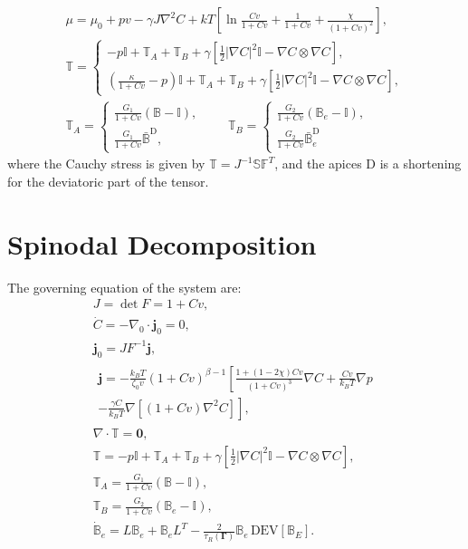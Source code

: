 \documentclass[12pt]{extarticle}
\newcommand{\F}{\ensuremath{\mathbb{F}}}
\newcommand{\B}{\ensuremath{\mathbb{B}}}
\newcommand{\D}{\ensuremath{\text{D}}}
\begin{document}
\begin{gather}
\mu = \mu_0 + p v - \gamma J\nabla^2 C + kT\left[\ln \frac{Cv}{1+Cv} + \frac{1}{1+Cv} +\frac{\chi}{(1+Cv)^2}\right],\\
\mathbb{T} = \begin{cases}
-p \mathbb{I} +\mathbb{T}_A +\mathbb{T}_B + \gamma\left[\frac{1}{2} |\nabla C|^2\mathbb{I}-\nabla C \otimes \nabla C\right],\\[2mm]
\left(\frac{\kappa}{1+Cv}-p\right) \mathbb{I} +\mathbb{T}_A +\mathbb{T}_B + \gamma\left[\frac{1}{2} |\nabla C|^2\mathbb{I}-\nabla C \otimes \nabla C\right],
\end{cases}\\
\mathbb{T}_A=\begin{cases}
\frac{G_1}{1+Cv}(\mathbb{B}-\mathbb{I}),\\[2mm]
\frac{G_1}{1+Cv} \bar{\B}^\D,
\end{cases}
\qquad
\mathbb{T}_B=\begin{cases}
\frac{G_2}{1+Cv}(\mathbb{B}_e-\mathbb{I}),\\[2mm]
\frac{G_2}{1+Cv} \bar{\B}^\D_e
\end{cases}
\end{gather}
where the Cauchy stress is given by $\mathbb{T}=J^{-1} \mathbb{S}\F^T $, and the apices $\D$ is a shortening for the deviatoric part of the tensor.
\section{Spinodal Decomposition}
The governing equation of the system are:
\begin{gather}
J=\det F=1+Cv,\\
\dot{C} = -\nabla_0 \cdot \mathbf{j}_0 = 0,\\
\mathbf{j}_0= J F^{-1} \mathbf{j},\\[5mm]
\begin{aligned}
\mathbf{j} = -\frac{k_B T}{\zeta_0 v}\left(1+Cv\right)^{\beta-1}\left[ \frac{1+(1-2\chi)Cv}{(1+Cv)^3}\nabla C +\frac{Cv}{k_B T}\nabla p\right.\\
\left.- \frac{\gamma C}{k_BT}\nabla[(1+Cv)\nabla^2 C]\right],
\end{aligned}\\[5mm]
\nabla \cdot \mathbb{T} = \mathbf{0},\\[5mm]
\mathbb{T}= -p \mathbb{I} +\mathbb{T}_A +\mathbb{T}_B + \gamma\left[\frac{1}{2} |\nabla C|^2\mathbb{I}-\nabla C \otimes \nabla C\right],\\[5mm]
\mathbb{T}_A=\frac{G_1}{1+Cv}(\B-\mathbb{I}),\\
\mathbb{T}_B=\frac{G_2}{1+Cv}(\B_e-\mathbb{I}),\\[5mm]
\dot{\B}_e= L \B_e +\B_e L^T - \frac{2}{\tau_R(\boldsymbol{\Gamma})} \B_e \,\text{DEV}[\B_E].
\end{gather}
\end{document}

